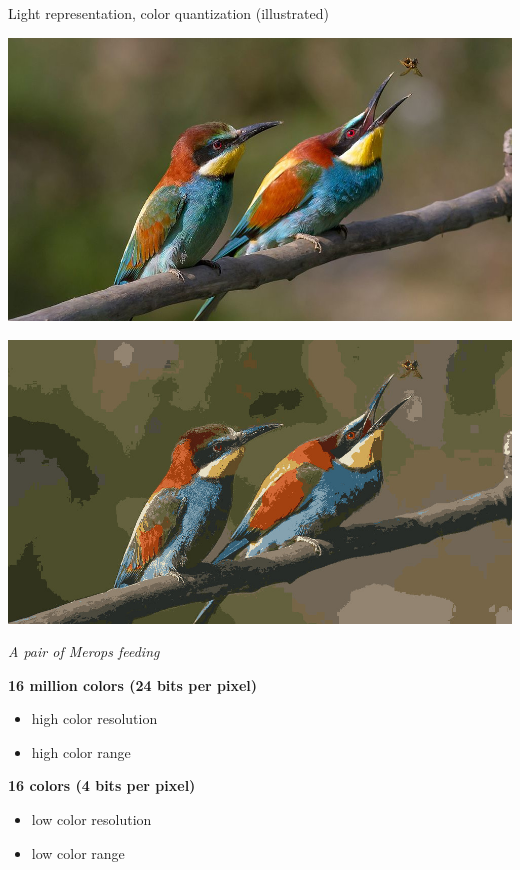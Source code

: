 \begin{frame}{Light representation, color quantization (illustrated)}
  \begin{minipage}[b]{0.45\textwidth}
    \centering
    \includegraphics[width=\textwidth]{slides/graphics-theory/pair-of-merops.jpg}
  \end{minipage}
  \hfill
  \begin{minipage}[b]{0.45\textwidth}
    \centering
    \includegraphics[width=\textwidth]{slides/graphics-theory/pair-of-merops-16-colors.jpg}
  \end{minipage}

  \begin{center}
     \textit{\small A pair of Merops feeding}
  \end{center}

  \begin{minipage}[b]{0.45\textwidth}
    \centering
    \textbf{16 million colors (24 bits per pixel)}
    \begin{itemize}
    \item high color resolution
    \item high color range
    \end{itemize}
  \end{minipage}
  \hfill
  \begin{minipage}[b]{0.45\textwidth}
    \centering
    \textbf{16 colors (4 bits per pixel)}
    \begin{itemize}
    \item low color resolution
    \item low color range
    \end{itemize}
  \end{minipage}
\end{frame}

